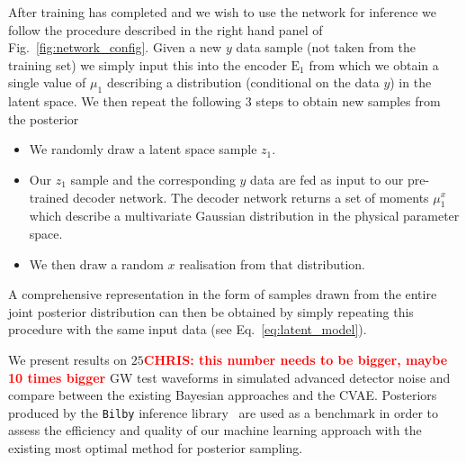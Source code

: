 \documentclass[%
showpacs,
 amsmath,amssymb,
 aps,
 twocolumn,
 prl,
 reprint,
floatfix,
]{revtex4-1}
\newcommand{\chris}[1]{\textbf{\textcolor{red}{CHRIS: #1}}}
\begin{document}
%
%
After training has completed and we wish to use the network for inference we
follow the procedure described in the right hand panel of
Fig.~\ref{fig:network_config}. Given a new $y$ data sample (not taken from the
training set) we simply input this into the encoder $\textrm{E}_1$ from which
we obtain a single value of $\mu_{1}$ describing a distribution (conditional on
the data $y$) in the latent space. We then repeat the following 3 steps to
obtain new samples from the posterior

%
\begin{itemize}
%
\item We randomly draw a latent space sample $z_1$. 
%
\item Our $z_1$ sample and the corresponding $y$ data are fed as input to our
pre-trained decoder network. The decoder network returns a set of moments
$\mu^{x}_1$ which describe a multivariate Gaussian distribution in the physical
parameter space.
%
\item We then draw a random $x$ realisation from that distribution. 
%
\end{itemize}
%
A comprehensive representation in the form of samples drawn from the entire
joint posterior distribution can then be obtained by simply repeating this
procedure with the same input data (see Eq.~\ref{eq:latent_model}).

%
%
%
%
We present results on $25$\chris{this number needs to be bigger, maybe 10 times
bigger} \ac{GW} test waveforms in simulated advanced detector noise and compare
between the existing Bayesian approaches and the \ac{CVAE}. Posteriors produced
by the \texttt{Bilby} inference library~\cite{1811.02042} are used as a
benchmark in order to assess the efficiency and quality of our machine learning
approach with the existing most optimal method for posterior sampling.
\end{document}
